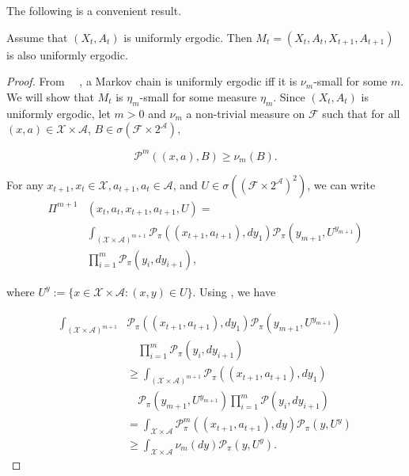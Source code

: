 \begin{appendices}
\noindent The following is a convenient result.

\begin{lemma}
Assume that $(X_t, A_t)$ is uniformly ergodic. Then $M_t = (X_t, A_t, X_{t + 1}, A_{t + 1})$ is also uniformly ergodic.
\end{lemma}
\begin{proof}
From ~\citeauthor[p.389]{meyn2012markov}~, a Markov chain is uniformly ergodic iff it is $\nu_m$-small for some $m$. We will show that $M_t$ is $\eta_m$-small for some measure $\eta_m$. Since $(X_t, A_t)$ is uniformly ergodic, let $m > 0$ and $\nu_m$ a non-trivial measure on $\mathcal{F}$ such that for all $(x, a) \in \mathcal{X} \times \mathcal{A}$, $B \in \sigma(\mathcal{F} \times 2^\mathcal{A})$,

\begin{equation}\label{eq:p-small}
    \mathcal{P}^m((x, a), B) \geq \nu_m(B).
\end{equation}

For any $x_{t + 1}, x_t \in \mathcal{X}, a_{t + 1}, a_t \in \mathcal{A}$, and $U \in \sigma((\mathcal{F} \times 2^\mathcal{A})^2)$, we can write
\begin{align*}
    \Pi^{m + 1}&(x_t, a_t, x_{t + 1}, a_{t + 1}, U) =\\
    &\int_{(\mathcal{X} \times \mathcal{A})^{m + 1}} \mathcal{P}_\pi((x_{t + 1}, a_{t + 1}), dy_1) \mathcal{P}_\pi(y_{m + 1}, U^{y_{m + 1}})\\ \nonumber
    &\prod_{i = 1}^m \mathcal{P}_\pi(y_i, dy_{i + 1}), \nonumber
\end{align*}

\noindent where $U^y := \{x \in \mathcal{X} \times \mathcal{A} : (x, y) \in U\}$. Using , we have

\begin{align*}
    \int_{(\mathcal{X} \times \mathcal{A})^{m + 1}} &\mathcal{P}_\pi((x_{t + 1}, a_{t + 1}), dy_1) \mathcal{P}_\pi(y_{m + 1}, U^{y_{m + 1}}) \\
    &\quad\prod_{i = 1}^m \mathcal{P}_\pi(y_i, dy_{i + 1})\\
    &\geq \int_{(\mathcal{X} \times \mathcal{A})^{m + 1}} \mathcal{P}_\pi((x_{t + 1}, a_{t + 1}), dy_1) \\
    &\quad\mathcal{P}_\pi(y_{m + 1}, U^{y_{m + 1}})\prod_{i = 1}^m \mathcal{P}(y_i, dy_{i + 1})\\
    &= \int_{\mathcal{X} \times \mathcal{A}} \mathcal{P}_\pi^m((x_{t + 1}, a_{t + 1}), dy) \mathcal{P}_\pi(y, U^y)\\
    &\geq \int_{\mathcal{X} \times \mathcal{A}} \nu_m(dy) \mathcal{P}_\pi(y, U^y).
\end{align*}


\end{proof}
\end{appendices}

